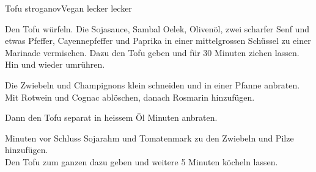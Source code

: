 
\begin{recipe}[]{Tofu stroganov}{Vegan lecker lecker}{}



\step
Den Tofu w\"urfeln. Die Sojasauce, Sambal Oelek, Oliven\"ol, zwei \TL scharfer Senf und etwas Pfeffer, Cayennepfeffer und Paprika in einer mittelgrossen Sch\"ussel zu einer Marinade vermischen. Dazu den Tofu geben und f\"ur 30 Minuten ziehen lassen. Hin und wieder umr\"uhren.

\step
Die Zwiebeln und Champignons klein schneiden und in einer Pfanne anbraten. Mit Rotwein und Cognac abl\"oschen, danach Rosmarin hinzuf\"ugen.

\step
Dann den Tofu separat in heissem \"Ol  Minuten anbraten.

 Minuten vor Schluss Sojarahm und Tomatenmark zu den Zwiebeln und Pilze hinzuf\"ugen. \\
Den Tofu zum ganzen dazu geben und weitere 5 Minuten k\"ocheln lassen.



\end{recipe}
